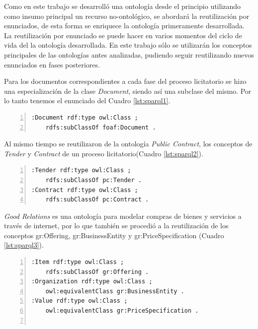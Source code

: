 Como en este trabajo se desarrolló una ontología desde el principio utilizando como insumo principal un recurso no-ontológico, se abordará la reutilización por enunciados, de esta forma se enriquece la ontología primeramente desarrollada. La reutilización por enunciado se puede hacer en varios momentos del ciclo de vida del la ontología desarrollada. En este trabajo sólo se utilizarán los conceptos principales de las ontologías antes analizadas, pudiendo seguir reutilizando nuevos enunciados en fases posteriores.

Para los documentos correspondientes a cada fase del proceso licitatorio se hizo una especialización de la clase \textit{Document}, siendo así una subclase del mismo. Por lo tanto tenemos el enunciado del Cuadro \ref{lst:sparql1}.\hfill \break


\noindent\begin{minipage}{\textwidth}

\begin{lstlisting}[captionpos=b, caption={Reutilización de la Clase Document}, label={lst:sparql1},  numbers=left,  numberstyle=\tiny\color{mygray},
    basicstyle=\ttfamily,frame=single]
:Document rdf:type owl:Class ;
    rdfs:subClassOf foaf:Document .
\end{lstlisting}
\end{minipage}

 Al mismo tiempo se reutilizaron de la ontología \textit{Public Contract}, los conceptos de \textit{Tender} y \textit{Contract} de un proceso licitatorio(Cuadro \ref{lst:sparql2}).\hfill \break

\noindent\begin{minipage}{\textwidth}
 \begin{lstlisting}[captionpos=b, caption={Conceptos de Tender y Contract}, label={lst:sparql2},  numbers=left,  numberstyle=\tiny\color{mygray},
    basicstyle=\ttfamily,frame=single]
:Tender rdf:type owl:Class ;
    rdfs:subClassOf pc:Tender .
:Contract rdf:type owl:Class ;
    rdfs:subClassOf pc:Contract .
\end{lstlisting}
\end{minipage}

 \textit{Good Relations} es una ontología para modelar compras de bienes y servicios a través de internet, por lo que también se procedió a la reutilización de los conceptos gr:Offering, gr:BusinessEntity y gr:PriceSpecification (Cuadro \ref{lst:sparql3}).\hfill \break

\noindent\begin{minipage}{\textwidth}
 \begin{lstlisting}[captionpos=b, caption={Conceptos de Organization y Price}, label={lst:sparql3},  numbers=left,  numberstyle=\tiny\color{mygray},
    basicstyle=\ttfamily,frame=single]
:Item rdf:type owl:Class ;
    rdfs:subClassOf gr:Offering .
:Organization rdf:type owl:Class ;
    owl:equivalentClass gr:BusinessEntity .
:Value rdf:type owl:Class ;
    owl:equivalentClass gr:PriceSpecification .


 \end{lstlisting}
\end{minipage}


